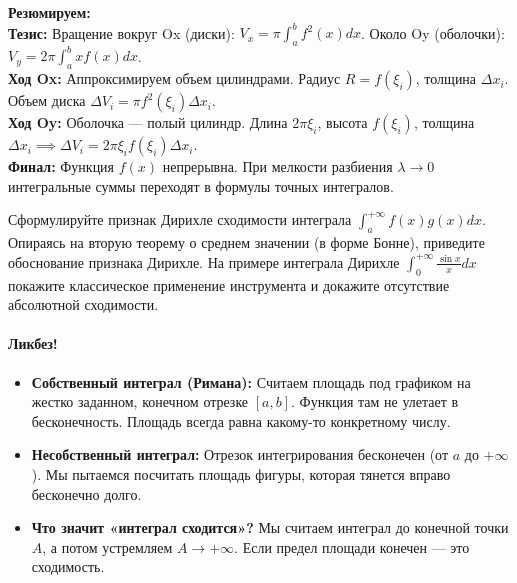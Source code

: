 \begin{tcolorbox}[colback=gray!5, colframe=black, boxrule=0.5pt, arc=0pt]
\textbf{Резюмируем:} \\
\textbf{Тезис:} Вращение вокруг Ox (диски): $V_x = \pi \int_a^b f^2(x) dx$. Около Oy (оболочки): $V_y = 2\pi \int_a^b x f(x) dx$. \\
\textbf{Ход Ox:} Аппроксимируем объем цилиндрами. Радиус $R=f(\xi_i)$, толщина $\Delta x_i$. Объем диска $\Delta V_i = \pi f^2(\xi_i) \Delta x_i$. \\
\textbf{Ход Oy:} Оболочка — полый цилиндр. Длина $2\pi \xi_i$, высота $f(\xi_i)$, толщина $\Delta x_i \implies \Delta V_i = 2\pi \xi_i f(\xi_i) \Delta x_i$. \\
\textbf{Финал:} Функция $f(x)$ непрерывна. При мелкости разбиения $\lambda \to 0$ интегральные суммы переходят в формулы точных интегралов.
\end{tcolorbox}






{Сформулируйте признак Дирихле сходимости интеграла $\int_a^{+\infty} f(x)g(x) dx$. Опираясь на вторую теорему о среднем значении (в форме Бонне), приведите обоснование признака Дирихле. На примере интеграла Дирихле $\int_0^{+\infty} \frac{\sin x}{x} dx$ покажите классическое применение инструмента и докажите отсутствие абсолютной сходимости.}

\paragraph{Ликбез!}
\begin{itemize}
    \item \textbf{Собственный интеграл (Римана):} Считаем площадь под графиком на жестко заданном, конечном отрезке $[a, b]$. Функция там не улетает в бесконечность. Площадь всегда равна какому-то конкретному числу.
    \item \textbf{Несобственный интеграл:} Отрезок интегрирования бесконечен (от $a$ до $+\infty$). Мы пытаемся посчитать площадь фигуры, которая тянется вправо бесконечно долго.
    \item \textbf{Что значит «интеграл сходится»?} Мы считаем интеграл до конечной точки $A$, а потом устремляем $A \to +\infty$. Если предел площади конечен — это сходимость.
\end{itemize}


